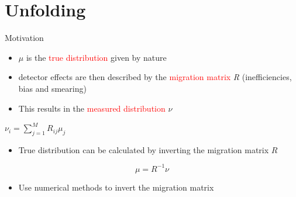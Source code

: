 \documentclass[
		10pt
		]{beamer}
\begin{document}
	



\section{Unfolding}

\begin{frame}{Motivation}
	\begin{itemize}
		\item $\mu$ is the \textcolor{red}{true distribution} given by nature
		\item detector effects are then described by the \textcolor{red}{migration matrix} \textit{R} (inefficiencies, bias and smearing)
		\item This results in the \textcolor{red}{measured distribution} $\nu$ 
	\end{itemize}
		\begin{center}
$		\nu_i = \sum_{j=1}^{M} R_{ij} \mu_j$  
		\end{center}
	
	\begin{itemize}		
		\item True distribution can be calculated by inverting the migration matrix $R$
		
	\end{itemize}

\begin{equation*}
	\mu = R^{-1} \nu
\end{equation*}

\begin{itemize}
	\item Use numerical methods to invert the migration matrix 
\end{itemize}


\end{frame}
\end{document}
